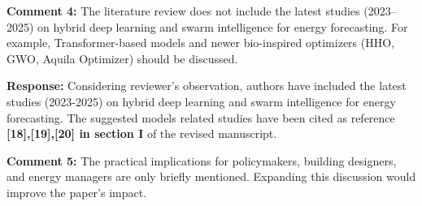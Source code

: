 \documentclass[12pt]{article}
\begin{document}





\noindent\textbf{Comment 4:} The literature review does not include the latest studies (2023–2025) on hybrid deep learning and swarm intelligence for energy forecasting. For example, Transformer-based models and newer bio-inspired optimizers (HHO, GWO, Aquila Optimizer) should be discussed.
\newline

\hspace{-1.5em}\textbf{Response:} Considering reviewer's observation, authors have included the latest studies (2023-2025) on hybrid deep learning and swarm intelligence for energy forecasting. The suggested models related studies have been cited as reference \textbf{[18],[19],[20] in section I} of the revised manuscript.\newline
\newline

\noindent\textbf{Comment 5:} The practical implications for policymakers, building designers, and energy managers are only briefly mentioned. Expanding this discussion would improve the paper’s impact.
\vspace{0.15cm}
\end{document}
